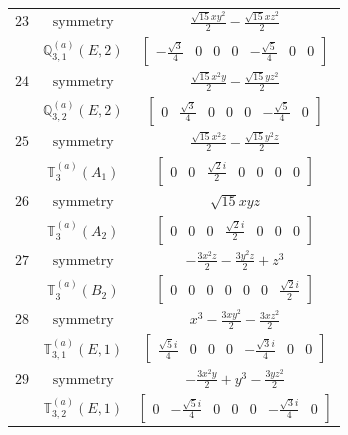 \documentclass[fleqn,8pt,landscape]{jsarticle}
\begin{document}
\begin{longtable}{ccc}
$ 23 $ & $ \text{symmetry} $ & $ \frac{\sqrt{15} x y^{2}}{2} - \frac{\sqrt{15} x z^{2}}{2} $ \\
$  $ & $ \mathbb{Q}_{3,1}^{(a)}(E,2) $ & $ \begin{bmatrix} - \frac{\sqrt{3}}{4} & 0 & 0 & 0 & - \frac{\sqrt{5}}{4} & 0 & 0 \end{bmatrix} $ \\ \hline
$ 24 $ & $ \text{symmetry} $ & $ \frac{\sqrt{15} x^{2} y}{2} - \frac{\sqrt{15} y z^{2}}{2} $ \\
$  $ & $ \mathbb{Q}_{3,2}^{(a)}(E,2) $ & $ \begin{bmatrix} 0 & \frac{\sqrt{3}}{4} & 0 & 0 & 0 & - \frac{\sqrt{5}}{4} & 0 \end{bmatrix} $ \\ \hline
$ 25 $ & $ \text{symmetry} $ & $ \frac{\sqrt{15} x^{2} z}{2} - \frac{\sqrt{15} y^{2} z}{2} $ \\
$  $ & $ \mathbb{T}_{3}^{(a)}(A_{1}) $ & $ \begin{bmatrix} 0 & 0 & \frac{\sqrt{2} i}{2} & 0 & 0 & 0 & 0 \end{bmatrix} $ \\ \hline
$ 26 $ & $ \text{symmetry} $ & $ \sqrt{15} x y z $ \\
$  $ & $ \mathbb{T}_{3}^{(a)}(A_{2}) $ & $ \begin{bmatrix} 0 & 0 & 0 & \frac{\sqrt{2} i}{2} & 0 & 0 & 0 \end{bmatrix} $ \\ \hline
$ 27 $ & $ \text{symmetry} $ & $ - \frac{3 x^{2} z}{2} - \frac{3 y^{2} z}{2} + z^{3} $ \\
$  $ & $ \mathbb{T}_{3}^{(a)}(B_{2}) $ & $ \begin{bmatrix} 0 & 0 & 0 & 0 & 0 & 0 & \frac{\sqrt{2} i}{2} \end{bmatrix} $ \\ \hline
$ 28 $ & $ \text{symmetry} $ & $ x^{3} - \frac{3 x y^{2}}{2} - \frac{3 x z^{2}}{2} $ \\
$  $ & $ \mathbb{T}_{3,1}^{(a)}(E,1) $ & $ \begin{bmatrix} \frac{\sqrt{5} i}{4} & 0 & 0 & 0 & - \frac{\sqrt{3} i}{4} & 0 & 0 \end{bmatrix} $ \\ \hline
$ 29 $ & $ \text{symmetry} $ & $ - \frac{3 x^{2} y}{2} + y^{3} - \frac{3 y z^{2}}{2} $ \\
$  $ & $ \mathbb{T}_{3,2}^{(a)}(E,1) $ & $ \begin{bmatrix} 0 & - \frac{\sqrt{5} i}{4} & 0 & 0 & 0 & - \frac{\sqrt{3} i}{4} & 0 \end{bmatrix} $ \\ \hline

\end{longtable}
\end{document}

